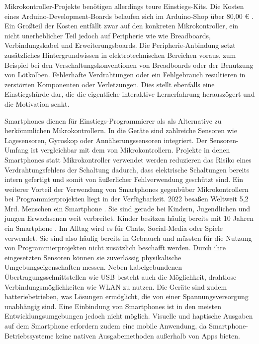 \documentclass[11pt,a4paper]{report}
\begin{document}
Mikrokontroller-Projekte benötigen allerdings teure Einstiegs-Kits.
Die Kosten eines Arduino-Development-Boards belaufen sich im Arduino-Shop über 80,00 € \cite{arduino_kit}.
Ein Großteil der Kosten entfällt zwar auf den konkreten Mikrokontroller, ein nicht unerheblicher Teil jedoch auf Peripherie wie wie Breadboards, Verbindungskabel und Erweiterungsboards.
Die Peripherie-Anbindung setzt zusätzliches Hintergrundwissen in elektrotechnischen Bereichen voraus, zum  Beispiel bei den Verschaltungskonventionen von Breadboards oder der Benutzung von Lötkolben.
Fehlerhafte Verdrahtungen oder ein Fehlgebrauch resultieren in zerstörten Komponenten oder Verletzungen.
Dies stellt ebenfalls eine Einstiegshürde dar, die die eigentliche interaktive Lernerfahrung herauszögert und die Motivation senkt.

Smartphones dienen für Einstiegs-Programmierer als als Alternative zu herkömmlichen Mikrokontrollern.
In die Geräte sind zahlreiche Sensoren wie Lagesensoren, Gyroskop oder Annäherungssensoren integriert.
Der Sensoren-Umfang ist vergleichbar mit dem von Mikrokontrollern.
Projekte in denen Smartphones statt Mikrokontroller verwendet werden reduzieren das Risiko eines Verdrahtungsfehlers der Schaltung dadurch, dass elektrische Schaltungen bereits intern gefertigt und somit von äußerlicher Fehlverwendung geschützt sind.
Ein weiterer Vorteil der Verwendung von Smartphones gegenbüber Mikrokontrollern bei Programmierprojekten liegt in der Verfügbarkeit.
2022 besaßen Weltweit 5,2 Mrd. Menschen ein Smartphone \cite{smartphone_users}.
Sie sind gerade bei Kindern, Jugendlichen und jungen Erwachsenen weit verbreitet.
Kinder besitzen häufig bereits mit 10 Jahren ein Smartphone \cite{bitkom_smartphones}.
Im Alltag wird es für Chats, Social-Media oder Spiele verwendet.
Sie sind also häufig bereits in Gebrauch und müssten für die Nutzung von Programmierprojekten nicht zusätzlich beschafft werden.
Durch ihre eingesetzten Sensoren können sie zuverlässig physikalische Umgebungseigenschaften messen.
Neben kabelgebundenen Übertragungsschnittstellen wie USB besteht auch die Möglichkeit, drahtlose Verbindungsmöglichkeiten wie WLAN zu nutzen.
Die Geräte sind zudem batteriebetrieben, was Lösungen ermöglicht, die von einer Spannungsversorgung unabhängig sind.
Eine Einbindung von Smartphones ist in den meisten Entwicklungsumgebungen jedoch nicht möglich.
Visuelle und haptische Ausgaben auf dem Smartphone erfordern zudem eine mobile Anwendung, da Smartphone-Betriebssysteme keine nativen Ausgabemethoden außerhalb von Apps bieten.
\end{document}
